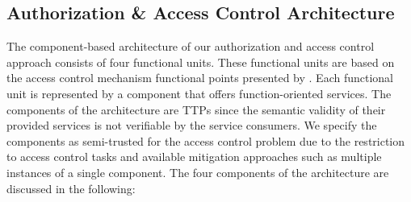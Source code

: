 \subsection{Authorization \& Access Control Architecture}
\label{sec:approach:sabaac:architecture}
The component-based architecture of our authorization and access control approach consists of four functional units.
These functional units are based on the access control mechanism functional points presented by \citeauthor{Hu2014} \cite{Hu2014}.
Each functional unit is represented by a component that offers function-oriented services.
The components of the architecture are TTPs since the semantic validity of their provided services is not verifiable by the service consumers.
We specify the components as semi-trusted for the access control problem due to the restriction to access control tasks and available mitigation approaches such as multiple instances of a single component.
The four components of the architecture are discussed in the following:
